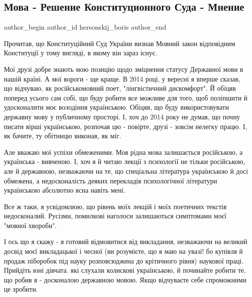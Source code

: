  
 
 
 
 
 
\subsection{Мова - Решение Конституционного Суда - Мнение}
\label{sec:15_07_2021.fb.hersonskij_boris.1.mova_ksu_mnenie}
 
\ifcmt
 author_begin
   author_id hersonskij_boris
 author_end
\fi

Прочитав, що Конституційний Суд України визнав Мовний закон відповідним Конституції у тому вигляді, в якому він зараз існує.

Мої друзі добре знають мою позицію щодо зміцнення статусу Державної мови в
нашій країні. А мої вороги - ще краще. В 2014 році, у вересні я вперше сказав,
що відчуваю, як російськомовний поет, "лінгвістичний дискомфорт". Й обіцяв
поперед усього сам собі, що буду робити все можливе для того, щоб поліпшити й
удосконалити моє володіння українською. Обіцяв, що буду використовувати
державну мову у публичному просторі. І, хоч до 2014 року не думав, що почну
писати вірші українською, розпочав цю - повірте, друзі - зовсім нелегку працю.
І, як бачите, ту обітницю виконав, як міг.

Але вважаю мої успіхи обмеженими. Моя рідна мова залишається російською, а
українська - вивченою. І, хоч я й читаю лекції з психології не тільки
російською, але й державною, незважаючи на те, що спеціальна література
українською й досі обмежена, а недосконалість деяких перекладів психологічної
літератури українською абсолютно ясна навіть мені.

Все ж таки, я усвідомлюю, що рівень моїх лекцій і моїх поетичних текстів
недосконалий. Русізми, помилкові наголоси залишаються симптомами моєї "мовної
хвороби".

І ось що я скажу - я готовий відмовитися від викладання, незважаючи на великий
досвід моєї викладацької і чесної (ви розумієте, що я маю на увазі! бо купівля
й продаж піборобок під науку розповсюджена до крітичного рівня)  наукової
праці. Прийдіть юні дівчата. які слухали колискові українською, й починайте
робити те, що робив я - досконалою державною мовою. Якщо відчуваєте себе
спроможними це зробити.


